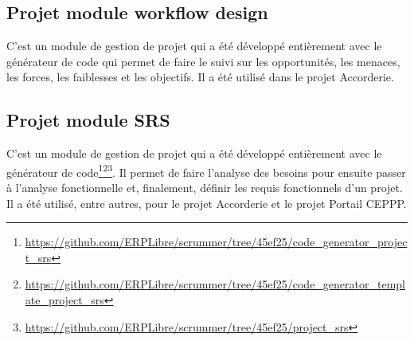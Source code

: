 \subsection{Projet module workflow design}

C’est un module de gestion de projet qui a été développé entièrement avec le générateur de code qui permet de faire le suivi sur les opportunités, les menaces, les forces, les faiblesses et les objectifs. Il a été utilisé dans le projet Accorderie.






\subsection{Projet module SRS}

C’est un module de gestion de projet qui a été développé entièrement avec le générateur de code\footnote{\url{https://github.com/ERPLibre/scrummer/tree/45ef25/code_generator_project_srs}}\footnote{\url{https://github.com/ERPLibre/scrummer/tree/45ef25/code_generator_template_project_srs}}\footnote{\url{https://github.com/ERPLibre/scrummer/tree/45ef25/project_srs}}. Il permet de faire l’analyse des besoins pour ensuite passer à l’analyse fonctionnelle et, finalement, définir les requis fonctionnels d’un projet. Il a été utilisé, entre autres, pour le projet Accorderie et le projet Portail CEPPP.

